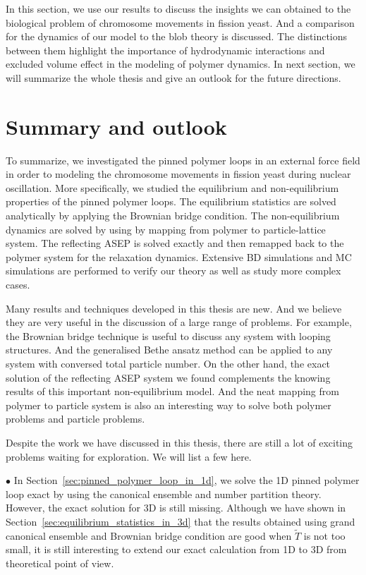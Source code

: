 In this section, we use our results to discuss the insights we can obtained to the biological problem of chromosome movements in fission yeast. And a comparison for the dynamics of our model to the blob theory is discussed. The distinctions between them highlight the importance of hydrodynamic interactions and excluded volume effect in the modeling of polymer dynamics. In next section, we will summarize the whole thesis and give an outlook for the future directions.





\section{Summary and outlook}
\label{sec:summary_and_outlook}

To summarize, we investigated the pinned polymer loops in an external force field in order to modeling the chromosome movements in fission yeast during nuclear oscillation. More specifically, we studied the equilibrium and non-equilibrium properties of the pinned polymer loops. The equilibrium statistics are solved analytically by applying the Brownian bridge condition. The non-equilibrium dynamics are solved by using by mapping from polymer to particle-lattice system. The reflecting ASEP is solved exactly and then remapped back to the polymer system for the relaxation dynamics. Extensive BD simulations and MC simulations are performed to verify our theory as well as study more complex cases.

Many results and techniques developed in this thesis are new. And we believe they are very useful in the discussion of a large range of problems. For example, the Brownian bridge technique is useful to discuss any system with looping structures. And the generalised Bethe ansatz method can be applied to any system with conversed total particle number. On the other hand, the exact solution of the reflecting ASEP system we found complements the knowing results of this important non-equilibrium model. And the neat mapping from polymer to particle system is also an interesting way to solve both polymer problems and particle problems.

Despite the work we have discussed in this thesis, there are still a lot of exciting problems waiting for exploration. We will list a few here.


$\bullet$ In Section~\ref{sec:pinned_polymer_loop_in_1d}, we solve the 1D pinned polymer loop exact by using the canonical ensemble and number partition theory. 
However, the exact solution for 3D is still missing. Although we have shown in Section~\ref{sec:equilibrium_statistics_in_3d} that the results obtained using grand canonical ensemble and Brownian bridge condition are good when $\tilde{T}$ is not too small, it is still interesting to extend our exact calculation from 1D to 3D from theoretical point of view. 

